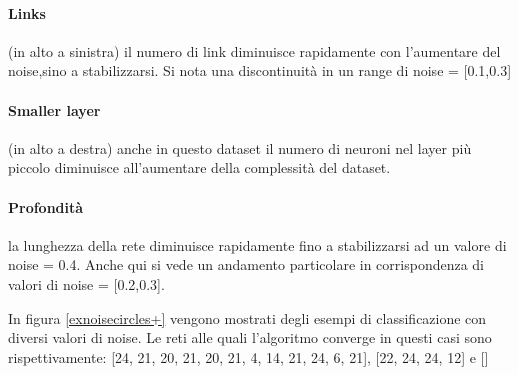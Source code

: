 \documentclass[12pt,a4paper]{report}
\begin{document}
\paragraph{Links} (in alto a sinistra) il numero di link diminuisce rapidamente con l'aumentare del noise,sino a stabilizzarsi. 
Si nota una discontinuità in un range di noise = [0.1,0.3] 

\paragraph{Smaller layer} (in alto a destra) anche in questo dataset il numero di neuroni nel layer più piccolo diminuisce all'aumentare della complessità del dataset.

\paragraph{Profondità} la lunghezza della rete diminuisce rapidamente fino a stabilizzarsi ad un valore di noise = 0.4.
Anche qui si vede un andamento particolare in corrispondenza di valori di noise = [0.2,0.3].

In figura \ref{exnoisecircles+} vengono mostrati degli esempi di classificazione con diversi valori di noise.
Le reti alle quali l'algoritmo converge in questi casi sono rispettivamente: [24, 21, 20, 21, 20, 21, 4, 14, 21, 24, 6, 21], [22, 24, 24, 12] e []
\end{document}
